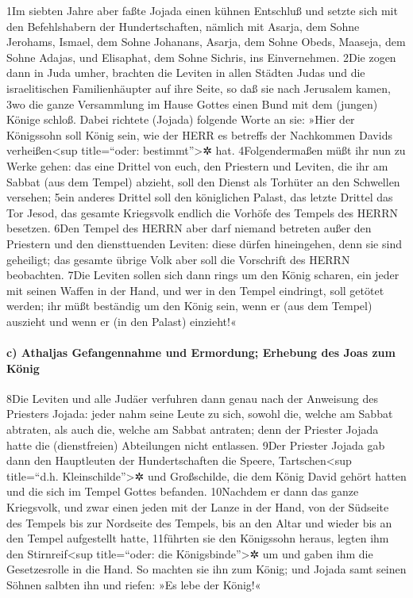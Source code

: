 1Im siebten Jahre aber faßte Jojada einen kühnen Entschluß und setzte
sich mit den Befehlshabern der Hundertschaften, nämlich mit Asarja, dem
Sohne Jerohams, Ismael, dem Sohne Johanans, Asarja, dem Sohne Obeds,
Maaseja, dem Sohne Adajas, und Elisaphat, dem Sohne Sichris, ins
Einvernehmen. 2Die zogen dann in Juda umher, brachten die Leviten in
allen Städten Judas und die israelitischen Familienhäupter auf ihre
Seite, so daß sie nach Jerusalem kamen, 3wo die ganze Versammlung im
Hause Gottes einen Bund mit dem (jungen) Könige schloß. Dabei richtete
(Jojada) folgende Worte an sie: »Hier der Königssohn soll König sein,
wie der HERR es betreffs der Nachkommen Davids verheißen\textless sup
title=``oder: bestimmt''\textgreater✲ hat. 4Folgendermaßen müßt ihr nun
zu Werke gehen: das eine Drittel von euch, den Priestern und Leviten,
die ihr am Sabbat (aus dem Tempel) abzieht, soll den Dienst als Torhüter
an den Schwellen versehen; 5ein anderes Drittel soll den königlichen
Palast, das letzte Drittel das Tor Jesod, das gesamte Kriegsvolk endlich
die Vorhöfe des Tempels des HERRN besetzen. 6Den Tempel des HERRN aber
darf niemand betreten außer den Priestern und den diensttuenden Leviten:
diese dürfen hineingehen, denn sie sind geheiligt; das gesamte übrige
Volk aber soll die Vorschrift des HERRN beobachten. 7Die Leviten sollen
sich dann rings um den König scharen, ein jeder mit seinen Waffen in der
Hand, und wer in den Tempel eindringt, soll getötet werden; ihr müßt
beständig um den König sein, wenn er (aus dem Tempel) auszieht und wenn
er (in den Palast) einzieht!«

\hypertarget{c-athaljas-gefangennahme-und-ermordung-erhebung-des-joas-zum-kuxf6nig}{%
\paragraph{c) Athaljas Gefangennahme und Ermordung; Erhebung des Joas
zum
König}\label{c-athaljas-gefangennahme-und-ermordung-erhebung-des-joas-zum-kuxf6nig}}

8Die Leviten und alle Judäer verfuhren dann genau nach der Anweisung des
Priesters Jojada: jeder nahm seine Leute zu sich, sowohl die, welche am
Sabbat abtraten, als auch die, welche am Sabbat antraten; denn der
Priester Jojada hatte die (dienstfreien) Abteilungen nicht entlassen.
9Der Priester Jojada gab dann den Hauptleuten der Hundertschaften die
Speere, Tartschen\textless sup title=``d.h. Kleinschilde''\textgreater✲
und Großschilde, die dem König David gehört hatten und die sich im
Tempel Gottes befanden. 10Nachdem er dann das ganze Kriegsvolk, und zwar
einen jeden mit der Lanze in der Hand, von der Südseite des Tempels bis
zur Nordseite des Tempels, bis an den Altar und wieder bis an den Tempel
aufgestellt hatte, 11führten sie den Königssohn heraus, legten ihm den
Stirnreif\textless sup title=``oder: die Königsbinde''\textgreater✲ um
und gaben ihm die Gesetzesrolle in die Hand. So machten sie ihn zum
König; und Jojada samt seinen Söhnen salbten ihn und riefen: »Es lebe
der König!«

